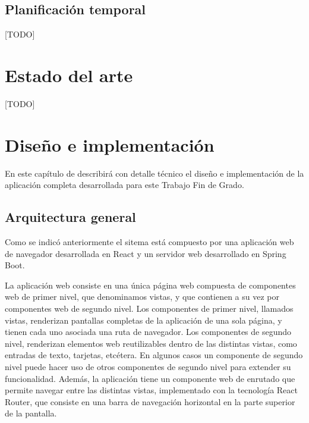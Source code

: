 \documentclass[a4paper, 12pt]{book}
\begin{document}
\section{Planificación temporal}
\label{sec:planificacion-temporal}

[TODO]



\cleardoublepage
\chapter{Estado del arte}
\label{chap:estado}

[TODO]



\cleardoublepage
\chapter{Diseño e implementación}

En este capítulo de describirá con detalle técnico el diseño e implementación de la aplicación completa desarrollada para este Trabajo Fin de Grado.

\section{Arquitectura general} 
\label{sec:architecture_impl}

Como se indicó anteriormente el sitema está compuesto por una aplicación web de navegador desarrollada en React y un servidor web desarrollado en Spring Boot. 

La aplicación web consiste en una única página web compuesta de componentes web de primer nivel, que denominamos vistas, y que contienen a su vez por componentes web de segundo nivel.
Los componentes de primer nivel, llamados vistas, renderizan pantallas completas de la aplicación de una sola página, y tienen cada uno asociada una ruta de navegador.
Los componentes de segundo nivel, renderizan elementos web reutilizables dentro de las distintas vistas, como entradas de texto, tarjetas, etcétera. En algunos casos un componente de segundo nivel puede hacer uso de otros componentes de segundo nivel para extender su funcionalidad.
Además, la aplicación tiene un componente web de enrutado que permite navegar entre las distintas vistas, implementado con la tecnología React Router, que consiste en una barra de navegación horizontal en la parte superior de la pantalla.
\end{document}
